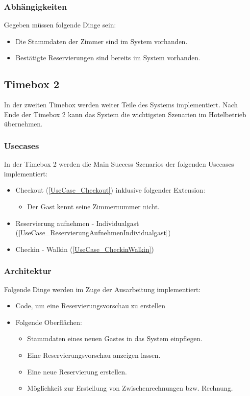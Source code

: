 \subsubsection{Abhängigkeiten}
Gegeben müssen folgende Dinge sein:

\begin{itemize}
	\item Die \Gls{Stammdaten} der \Gls{Zimmer} sind im System vorhanden.
	\item Bestätigte \Gls{Reservierung}en sind bereits im System vorhanden.
\end{itemize}

\subsection{Timebox 2}
In der zweiten Timebox werden weiter Teile des Systems implementiert.
Nach Ende der Timebox 2 kann das System die wichtigsten Szenarien im Hotelbetrieb übernehmen.

\subsubsection{Usecases}
In der Timebox 2 werden die Main Success Szenarios der folgenden Usecases implementiert:

\begin{itemize}
	\item Checkout (\ref{UseCase_Checkout}) inklusive folgender Extension:
	\begin{itemize}
		\item Der \Gls{Gast} kennt seine \Gls{Zimmernummer} nicht.
	\end{itemize}
	\item Reservierung aufnehmen - Individualgast (\ref{UseCase_ReservierungAufnehmenIndividualgast})
	\item Checkin - Walkin (\ref{UseCase_CheckinWalkin})
\end{itemize}

\subsubsection{Architektur}
Folgende Dinge werden im Zuge der Ausarbeitung implementiert:

\begin{itemize}
	\item Code, um eine \Gls{Reservierung}svorschau zu erstellen
	\item Folgende Oberflächen:
	\begin{itemize}
		\item Stammdaten eines neuen \Gls{Gast}es in das System einpflegen.
		\item Eine \Gls{Reservierung}svorschau anzeigen lassen.
		\item Eine neue \Gls{Reservierung} erstellen.
		\item Möglichkeit zur Erstellung von Zwischenrechnungen bzw. \Gls{Rechnung}.
	\end{itemize}
\end{itemize}

